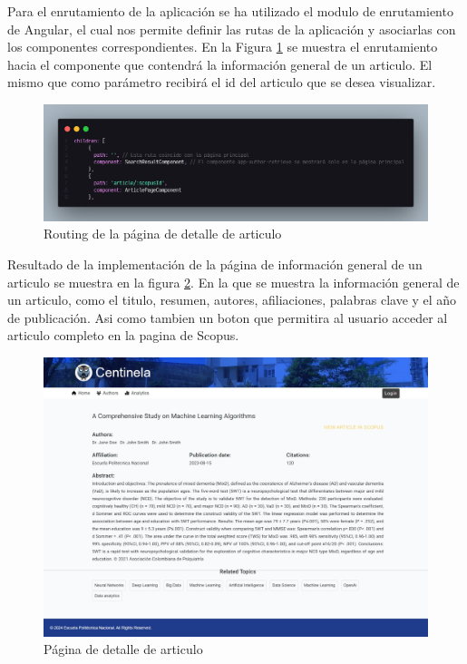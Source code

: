 Para el enrutamiento de la aplicación se ha utilizado el modulo de enrutamiento de Angular, el cual nos permite definir las rutas de la aplicación y asociarlas con los componentes correspondientes.
En la Figura \ref{fig:enrutamiento-article-page} se muestra el enrutamiento hacia el componente que contendrá la información general de un articulo. El mismo que como parámetro recibirá el id del articulo que se desea visualizar.
\begin{figure}[H]
    \centering
    \includegraphics[scale=0.2]{../02Figures/02Chapter/Sprints/Sprint-1/enrutamiento-article-page.png}
    \caption{Routing de la página de detalle de articulo}
    \label{fig:enrutamiento-article-page}
\end{figure}

Resultado de la implementación de la página de información general de un articulo se muestra en la figura \ref{fig:article-page}.
En la que se muestra la información general de un articulo, como el titulo, resumen, autores, afiliaciones, palabras clave y el año de publicación. Asi como tambien un boton que permitira al usuario acceder al articulo completo en la pagina de Scopus.

\begin{figure}[H]
    \centering
    \includegraphics[scale=0.160]{../02Figures/02Chapter/Sprints/Sprint-1/article-page.jpeg}
    \caption{Página de detalle de articulo}
    \label{fig:article-page}
\end{figure}

